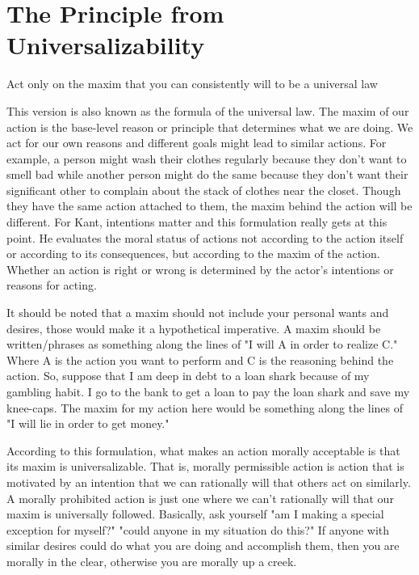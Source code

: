 \section{The Principle from Universalizability}
\begin{center}
Act only on the maxim that you can consistently will to be a universal law
\end{center}
This version is also known as the formula of the universal law. The maxim of our action is the base-level reason or principle that determines what we are doing. We act for our own reasons and different goals might lead to similar actions. For example, a person might wash their clothes regularly because they don't want to smell bad while another person might do the same because they don't want their significant other to complain about the stack of clothes near the closet. Though they have the same action attached to them, the maxim behind the action will be different.  For Kant, intentions matter and this formulation really gets at this point. He evaluates the moral status of actions not according to the action itself or according to its consequences, but according to the maxim of the action. Whether an action is right or wrong  is determined by the actor’s intentions or reasons for acting.

It should be noted that a maxim should not include your personal wants and desires, those would make it a hypothetical imperative. A maxim should be written/phrases as something along the lines of "I will A in order to realize C." Where A is the action you want to perform and C is the reasoning behind the action. So, suppose that I am deep in debt to a loan shark because of my gambling habit. I go to the bank to get a loan to pay the loan shark and save my knee-caps. The maxim for my action here would be something along the lines of "I will lie in order to get money."

According to this formulation, what makes an action morally acceptable is that its maxim is universalizable. That is, morally permissible action is action that is motivated by an intention that we can rationally will that others act on similarly. A morally prohibited action is just one where we can’t rationally will that our maxim is universally followed. Basically, ask yourself "am I making a special exception for myself?" "could anyone in my situation do this?" If anyone with similar desires could do what you are doing and accomplish them, then you are morally in the clear, otherwise you are morally up a creek.


